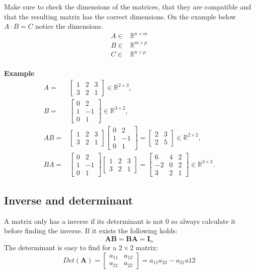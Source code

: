 Make sure to check the dimensions of the matrices, that they are compatible and that the resulting matrix has the correct dimensions.
On the example below $A \cdot B = C$ notice the dimensions.
\begin{align*}
  A \in& \mathbb{R}^{n \times m}\\
  B \in& \mathbb{R}^{m \times p}\\
  C \in& \mathbb{R}^{n \times p}\\
\end{align*}

\textbf{Example}
\begin{align*}
A =& \begin{bmatrix}
1 & 2 & 3 \\
3 & 2 & 1
\end{bmatrix} \in \mathbb{R}^{2 \times 3},\\
  B =& \begin{bmatrix}
0 & 2 \\
1 & -1 \\
0 & 1
\end{bmatrix} \in \mathbb{R}^{3 \times 2},\\
  AB =& \begin{bmatrix}
1 & 2 & 3 \\
3 & 2 & 1
\end{bmatrix}
\begin{bmatrix}
0 & 2 \\
1 & -1 \\
0 & 1
\end{bmatrix}
= \begin{bmatrix}
2 & 3 \\
2 & 5
\end{bmatrix} \in \mathbb{R}^{2 \times 2},\\
BA =& \begin{bmatrix}
0 & 2 \\
1 & -1 \\
0 & 1
\end{bmatrix}
\begin{bmatrix}
1 & 2 & 3 \\
3 & 2 & 1
\end{bmatrix}
= \begin{bmatrix}
6 & 4 & 2 \\
-2 & 0 & 2 \\
3 & 2 & 1
\end{bmatrix} \in \mathbb{R}^{3 \times 3}.
\end{align*}

\subsection{Inverse and determinant}
A matrix only has a inverse if its determinant is not 0 so always calculate it before finding the inverse. If it exists the following holds:
$$
\mathbf{AB} = \mathbf{BA} = \mathbf{I}_n
$$
\noindent
The determinant is easy to find for a $2 \times 2$ matrix:
$$
Det(\mathbf{A}) =
\begin{bmatrix}
  a_{11} & a_{12}\\
  a_{21} & a_{22}
\end{bmatrix}
= a_{11}a_{22} - a_{21}a{12}
$$

